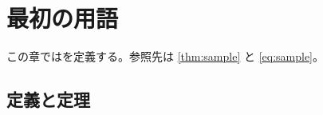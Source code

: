 \chapter[用語]{最初の用語}\label{ch:first}
この章では\sample を定義する。参照先は \ref{thm:sample} と \eqref{eq:sample}。

\section{定義と定理}\label{sec:sample}


